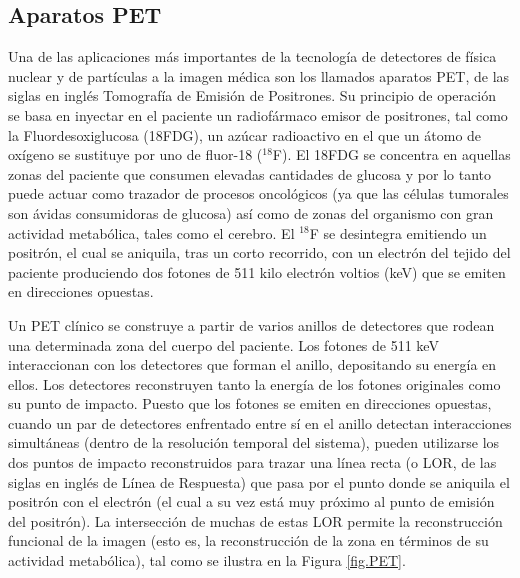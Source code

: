 
\subsection*{Aparatos PET}

 Una de las aplicaciones más importantes de la tecnología de detectores de física nuclear y de partículas a la imagen médica son los llamados aparatos PET, de las siglas en inglés Tomografía de Emisión de Positrones. Su principio de operación se basa en inyectar en el paciente un radiofármaco emisor de positrones, tal como la Fluordesoxiglucosa (18FDG), un azúcar radioactivo en el que un átomo de oxígeno se sustituye por uno de fluor-18 (\ensuremath{^{18}}F). El 18FDG se concentra en aquellas zonas del paciente que consumen elevadas cantidades de glucosa y por lo tanto puede actuar como trazador de procesos oncológicos (ya que las células tumorales son ávidas consumidoras de glucosa) así como de zonas del organismo con gran actividad metabólica, tales como el cerebro. El \ensuremath{^{18}}F se desintegra emitiendo un positrón, el cual se aniquila, tras un corto recorrido, con un electrón del tejido del paciente produciendo dos fotones de 511 kilo electrón voltios (keV) que se emiten en direcciones opuestas. 


\begin{center}  \end{center} 


Un PET clínico se construye a partir de varios anillos de detectores que rodean una determinada zona del cuerpo del paciente. Los fotones de 511 keV interaccionan con los detectores que forman el anillo, depositando su energía en ellos. Los detectores reconstruyen tanto la energía de los fotones originales como su punto de impacto. Puesto que los fotones se emiten en direcciones opuestas, cuando un par de detectores enfrentado entre sí en el anillo detectan interacciones simultáneas (dentro de la resolución temporal del sistema), pueden utilizarse los dos puntos de impacto reconstruidos para trazar una línea recta (o LOR, de las siglas en inglés de Línea de Respuesta) que pasa por el punto donde se aniquila el positrón con el electrón (el cual a su vez está muy próximo al punto de emisión del positrón). La intersección de muchas de estas LOR permite la reconstrucción funcional de la imagen (esto es, la reconstrucción de la zona en términos de su actividad metabólica), tal como se ilustra en la Figura \ref{fig.PET}.

